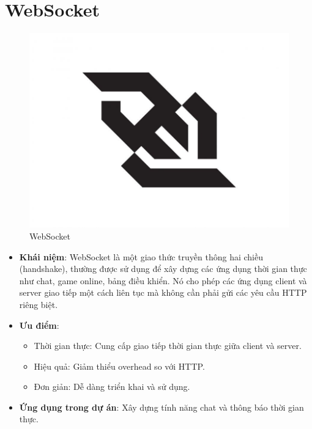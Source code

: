 \documentclass[../index.tex]{subfiles}
\begin{document}
    \section{WebSocket}
    \begin{figure}[H]
        \centering
        \includegraphics[width=0.2\linewidth]{figures/tech-logo/websocket.jpg}
        \caption{WebSocket}
    \end{figure}
    \begin{itemize}
        \item \textbf{Khái niệm}: WebSocket là một giao thức truyền thông hai chiều
            (handshake), thường được sử dụng để xây dựng các ứng dụng thời gian
            thực như chat, game online, bảng điều khiển. Nó cho phép các ứng dụng
            client và server giao tiếp một cách liên tục mà không cần phải gửi các
            yêu cầu HTTP riêng biệt.

        \item \textbf{Ưu điểm}:
            \begin{itemize}
                \item Thời gian thực: Cung cấp giao tiếp thời gian thực giữa
                    client và server.

                \item Hiệu quả: Giảm thiểu overhead so với HTTP.

                \item Đơn giản: Dễ dàng triển khai và sử dụng.
            \end{itemize}

        \item \textbf{Ứng dụng trong dự án}: Xây dựng tính năng chat và thông báo
            thời gian thực.
    \end{itemize}

\end{document}
